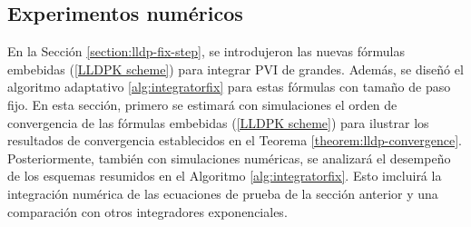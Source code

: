 \subsection{Experimentos numéricos}\label{section:num-exp-lldp-fix-step}
En la Sección \ref{section:lldp-fix-step}, se introdujeron las nuevas fórmulas embebidas (\ref{LLDPK scheme}) para integrar PVI de grandes. Además, se diseñó el algoritmo adaptativo \ref{alg:integratorfix} para estas fórmulas con tamaño de paso fijo. En esta sección, primero se estimará con simulaciones el orden de convergencia de las fórmulas embebidas (\ref{LLDPK scheme}) para ilustrar los resultados de convergencia establecidos en el Teorema \ref{theorem:lldp-convergence}. Posteriormente, también con simulaciones numéricas, se analizará el desempeño de los esquemas resumidos en el Algoritmo \ref{alg:integratorfix}. Esto imcluirá la integración numérica de las ecuaciones de prueba de la sección anterior y una comparación con otros integradores exponenciales.

